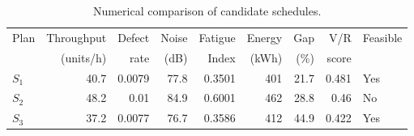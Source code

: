 \begin{table}[htbp]
\centering
\caption{Numerical comparison of candidate schedules.}
\label{tab:numerical-sim}
\small
\begin{tabular}{@{}lrrrrrrrl@{}}
\toprule
Plan & Throughput & Defect & Noise & Fatigue & Energy & Gap & V/R & Feasible \\
     & (units/h)  & rate   & (dB)  & Index   & (kWh)  & (\%) & score &         \\
\midrule
$S_{1}$ & 40.7 & 0.0079 & 77.8 & 0.3501 & 401 & 21.7 & 0.481 & Yes \\
$S_{2}$ & 48.2 & 0.01 & 84.9 & 0.6001 & 462 & 28.8 & 0.46 & No \\
$S_{3}$ & 37.2 & 0.0077 & 76.7 & 0.3586 & 412 & 44.9 & 0.422 & Yes \\
\bottomrule
\end{tabular}
\end{table}
